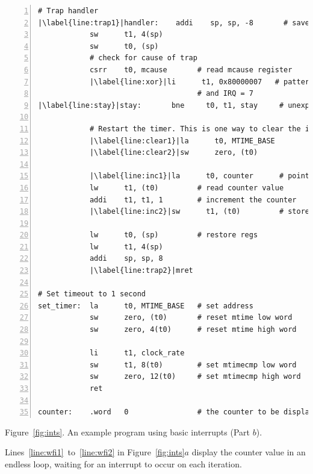 \documentclass[11pt, twoside, pdftex]{article}
\begin{document}
\begin{center}
\begin{minipage}[h]{15 cm}
\begin{lstlisting}[style=defaultNiosVStyle, name=ints, numbers=left, escapechar=|]
# Trap handler
|\label{line:trap1}|handler:    addi    sp, sp, -8       # save regs that will be modified
            sw      t1, 4(sp)
            sw      t0, (sp)
            # check for cause of trap
            csrr    t0, mcause       # read mcause register
            |\label{line:xor}|li      t1, 0x80000007   # pattern to check interrupt bit
                                     # and IRQ = 7
|\label{line:stay}|stay:       bne     t0, t1, stay     # unexpected cause of exception
            
            # Restart the timer. This is one way to clear the interrupt
            |\label{line:clear1}|la      t0, MTIME_BASE
            |\label{line:clear2}|sw      zero, (t0)

            |\label{line:inc1}|la      t0, counter      # pointer to counter
            lw      t1, (t0)         # read counter value
            addi    t1, t1, 1        # increment the counter
            |\label{line:inc2}|sw      t1, (t0)         # store counter to memory

            lw      t0, (sp)         # restore regs
            lw      t1, 4(sp)
            addi    sp, sp, 8
            |\label{line:trap2}|mret

# Set timeout to 1 second
set_timer:  la      t0, MTIME_BASE   # set address
            sw      zero, (t0)       # reset mtime low word
            sw      zero, 4(t0)      # reset mtime high word
            
            li      t1, clock_rate
            sw      t1, 8(t0)        # set mtimecmp low word
            sw      zero, 12(t0)     # set mtimecmp high word
            ret
     
counter:    .word   0                # the counter to be displayed\end{lstlisting}

\vspace{0.25in}
Figure~\ref{fig:ints}.	An example program using basic interrupts (Part $b$).
\end{minipage}
\end{center}

Lines~\ref{line:wfi1}~to~\ref{line:wfi2} in Figure~\ref{fig:ints}$a$ 
display the counter value in an endless loop,
waiting for an interrupt to occur on each iteration. 
\end{document}
